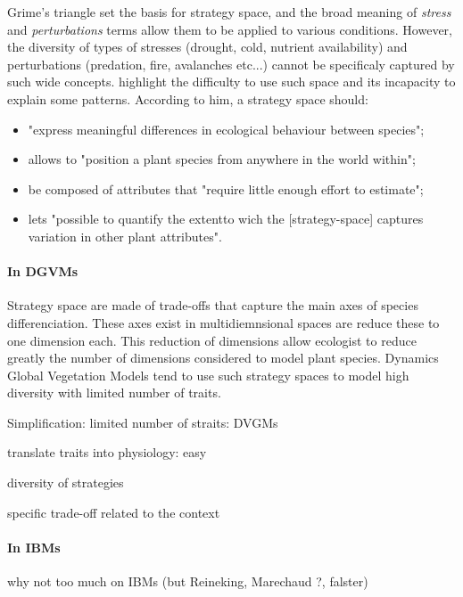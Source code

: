 Grime's triangle set the basis for strategy space, and the broad meaning of \textit{stress} and \textit{perturbations} terms allow them to be applied to various conditions. However, the diversity of types of stresses (drought, cold, nutrient availability) and perturbations (predation, fire, avalanches etc...) cannot be specificaly captured by such wide concepts. \cite{westoby_leaf-height-seed_1998} highlight the difficulty to use such space and its incapacity to explain some patterns. According to him, a strategy space should: 
\begin{itemize}
\item "express meaningful differences in ecological behaviour between species";
\item allows to "position a plant species from anywhere in the world within";
\item be composed of attributes that "require little enough effort to estimate";
\item lets "possible to quantify the extentto wich the [strategy-space] captures variation in other plant attributes".
\end{itemize}

\paragraph{In DGVMs}

Strategy space are made of trade-offs that capture the main axes of species differenciation. These axes exist in multidiemnsional spaces are reduce these to one dimension each. This reduction of dimensions allow ecologist to reduce greatly the number of dimensions considered to model plant species. Dynamics Global Vegetation Models tend to use such strategy spaces to model high diversity with limited number of traits. 

Simplification: limited number of straits: DVGMs

translate traits into physiology: easy

diversity of strategies

specific trade-off related to the context \parencite{scheiter_impacts_2009}

\paragraph{In IBMs}

why not too much on IBMs (but Reineking, Marechaud ?, falster)


